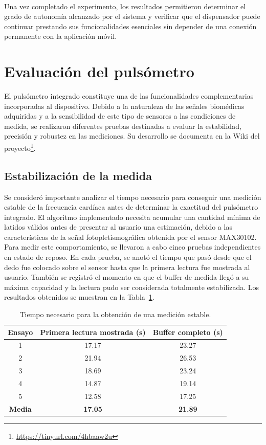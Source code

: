 \

Una vez completado el experimento, los resultados permitieron determinar el grado de autonomía alcanzado por el sistema y verificar que el dispensador puede continuar prestando sus funcionalidades esenciales sin depender de una conexión permanente con la aplicación móvil.

\section{Evaluación del pulsómetro}

El pulsómetro integrado constituye una de las funcionalidades complementarias incorporadas al dispositivo. Debido a la naturaleza de las señales biomédicas adquiridas y a la sensibilidad de este tipo de sensores a las condiciones de medida, se realizaron diferentes pruebas destinadas a evaluar la estabilidad, precisión y robustez en las mediciones. Su desarrollo se documenta en la Wiki del proyecto\footnote{\url{https://tinyurl.com/4hbaaw2u}}.\\

\subsection{Estabilización de la medida}

Se consideró importante analizar el tiempo necesario para conseguir una medición estable de la frecuencia cardíaca antes de determinar la exactitud del pulsómetro integrado. El algoritmo implementado necesita acumular una cantidad mínima de latidos válidos antes de presentar al usuario una estimación, debido a las características de la señal fotopletismográfica obtenida por el sensor MAX30102.\\

Para medir este comportamiento, se llevaron a cabo cinco pruebas independientes en estado de reposo. En cada prueba, se anotó el tiempo que pasó desde que el dedo fue colocado sobre el sensor hasta que la primera lectura fue mostrada al usuario. También se registró el momento en que el buffer de medida llegó a su máxima capacidad y la lectura pudo ser considerada totalmente estabilizada. Los resultados obtenidos se muestran en la Tabla~\ref{tab:estabilizacion_pulso}.\\

\begin{table}[H]
\centering
\caption{Tiempo necesario para la obtención de una medición estable.}
\label{tab:estabilizacion_pulso}
\begin{tabular}{|c|c|c|}
\hline
\textbf{Ensayo} & \textbf{Primera lectura mostrada (s)} & \textbf{Buffer completo (s)} \\ \hline
1 & 17.17 & 23.27 \\ \hline
2 & 21.94 & 26.53 \\ \hline
3 & 18.69 & 23.24 \\ \hline
4 & 14.87 & 19.14 \\ \hline
5 & 12.58 & 17.25 \\ \hline
\textbf{Media} & \textbf{17.05} & \textbf{21.89} \\ \hline
\end{tabular}
\end{table}

